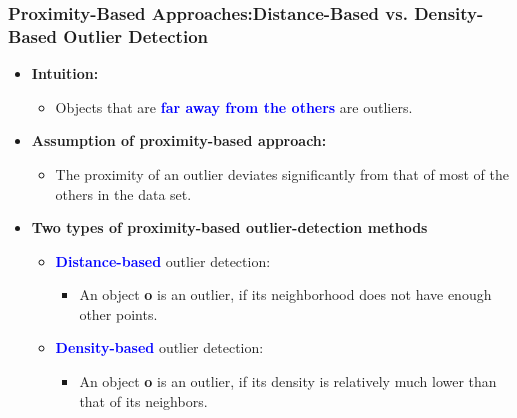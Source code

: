 \documentclass[aspectratio=169,t,xcolor=dvipsnames]{beamer}
\newcommand{\blue}[1]{\textbf{\textcolor{blue}{#1}}}
\begin{document}
\begin{frame}
	\frametitle{Proximity-Based Approaches:Distance-Based vs. Density-Based Outlier Detection}
	\begin{itemize}
		\item \textbf{Intuition:}
		      \begin{itemize}
		      	\item Objects that are \blue{far away from the others} are outliers.
		      \end{itemize}
		\item \textbf{Assumption of proximity-based approach:}
		      \begin{itemize}
		      	\item The proximity of an outlier deviates significantly from that of most of the others in the data set.
		      \end{itemize}
		\item \textbf{Two types of proximity-based outlier-detection methods}
		      \begin{itemize}
		      	\item \blue{Distance-based} outlier detection:
		      	      \begin{itemize}
		      	      	\item An object \textbf{o} is an outlier, if its neighborhood does not have enough other points.
		      	      \end{itemize}
		      	\item \blue{Density-based} outlier detection:
		      	      \begin{itemize}
		      	      	\item An object \textbf{o} is an outlier, if its density is relatively much lower than that of its neighbors.
		      	      \end{itemize}
		      \end{itemize}
	\end{itemize}
\end{frame}
\end{document}
